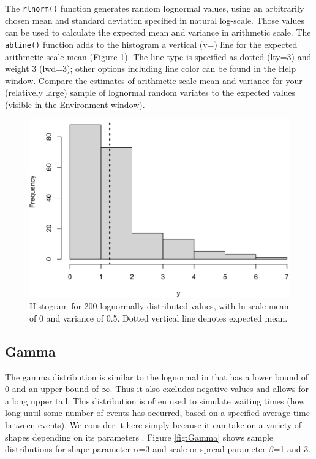 \documentclass[
]{krantz}
\begin{document}
The \texttt{rlnorm()} function generates random lognormal values, using an arbitrarily chosen mean and standard deviation specified in natural log-scale. Those values can be used to calculate the expected mean and variance in arithmetic scale. The \texttt{abline()} function adds to the histogram a vertical (v=) line for the expected arithmetic-scale mean (Figure \ref{fig:Lognormal}). The line type is specified as dotted (lty=3) and weight 3 (lwd=3); other options including line color can be found in the Help window. Compare the estimates of arithmetic-scale mean and variance for your (relatively large) sample of lognormal random variates to the expected values (visible in the Environment window).

\begin{figure}
\includegraphics[width=0.9\linewidth]{bookdown_files/figure-latex/Lognormal-1} \caption{Histogram for 200 lognormally-distributed values, with ln-scale mean of 0 and variance of 0.5. Dotted vertical line denotes expected mean.}\label{fig:Lognormal}
\end{figure}

\hypertarget{GammaDist}{%
\subsection{Gamma}\label{GammaDist}}

The gamma distribution is similar to the lognormal in that has a lower bound of 0 and an upper bound of \(\infty\). Thus it also excludes negative values and allows for a long upper tail. This distribution is often used to simulate waiting times (how long until some number of events has occurred, based on a specified average time between events). We consider it here simply because it can take on a variety of shapes depending on its parameters \citep{bolker2008}. Figure \ref{fig:Gamma} shows sample distributions for shape parameter \(\alpha\)=3 and scale or spread parameter \(\beta\)=1 and 3.
\end{document}
